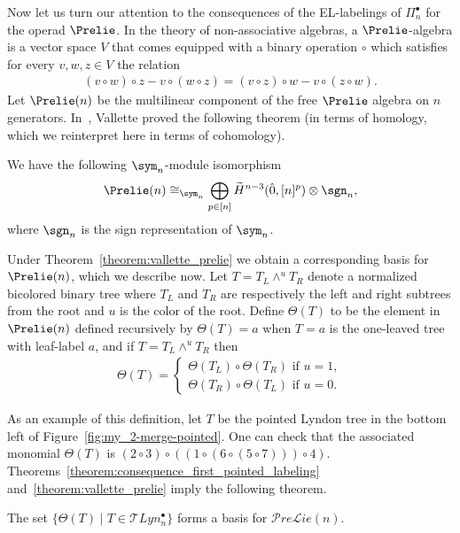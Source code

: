 Now let us turn our attention to the consequences of the EL-labelings of $\Pi_n^\bullet$ for the operad $\Prelie$. In the theory of non-associative algebras, a $\Prelie$-algebra is a vector space $V$ that comes equipped with a binary operation $\circ$ which satisfies for every $v,w,z \in V$ the relation
 \begin{align*}
     (v \circ w) \circ z - v \circ (w \circ z) =(v \circ z) \circ w - v \circ (z \circ w).
 \end{align*}
 Let $\Prelie(n)$ be the multilinear component of the free $\Prelie$ algebra on $n$ generators. In~\cite{Vallette2007}, Vallette 
 proved the following theorem (in terms of homology, which we reinterpret here in terms of cohomology).

 \begin{theo}\label{theorem:vallette_prelie}
 We have the following $\sym_n$-module isomorphism
$$\Prelie(n)\cong_{\sym_n}\bigoplus_{p\in[n]}\widetilde H^{n-3}(\hat{0},[n]^p)\otimes \sgn_{n},$$
 where $\sgn_n$ is the sign representation of $\sym_n$.
 \end{theo}
 
 Under Theorem~\ref{theorem:vallette_prelie} we obtain a corresponding basis for $\Prelie(n)$, which we describe now. Let  $T= T_L \wedge^u T_R$ denote a normalized bicolored binary tree where $T_L$ and $T_R$ are respectively the left and right subtrees from the root and $u$ is the color of the root.
 Define $\Theta(T)$ to be the element in $\Prelie(n)$ defined recursively by $\Theta(T)=a$ when $T=a$ is the one-leaved tree with leaf-label $a$, and if $T=T_L \wedge^u T_R$ then
 \begin{align*}
     \Theta(T)=\begin{cases}
         \Theta(T_L)\circ \Theta(T_R) \text{ if } u=1,\\
         \Theta(T_R)\circ \Theta(T_L) \text{ if } u=0.
     \end{cases}
 \end{align*}
   

     As an example of this definition, let $T$ be the  pointed Lyndon tree in the bottom left of Figure~\ref{fig:my_2-merge-pointed}.  One can check that the associated monomial $\Theta(T)$ is $(2\circ 3)\circ ((1\circ (6 \circ (5\circ 7))) \circ 4)$. Theorems~\ref{theorem:consequence_first_pointed_labeling} and~\ref{theorem:vallette_prelie} imply the following theorem.

     
    \begin{theo}\label{theorem:pointed_lyndon_basis_prelie}
The set
$\{\Theta(T) \mid T\in \mathcal{T}Lyn_{n}^{\bullet}\}$ forms a basis for $\mathcal{P}re\mathcal{L}ie(n)$.
    \end{theo}

